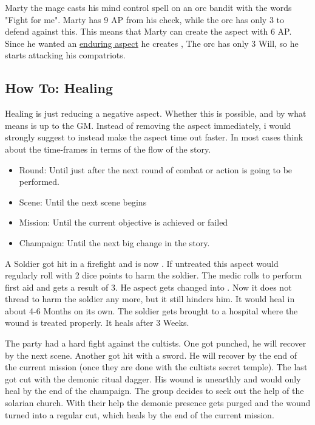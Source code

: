 \documentclass[11pt]{article}
\begin{document}
{\begin{pwexample}
Marty the mage casts his mind control spell on an orc bandit with the words "Fight for me". Marty has 9 AP from his check, while the orc has only 3 to defend against this. This means that Marty can create the aspect with 6 AP. Since he wanted an \hyperref[sec:orgd783730]{enduring aspect} he creates , The orc has only 3 Will, so he starts attacking his compatriots. 
\end{pwexample}
\subsection{How To: Healing}
\label{sec:org104db12}
Healing is just reducing a negative aspect. Whether this is possible, and by what means is up to the GM. Instead of removing the aspect immediately, i would strongly suggest to instead make the aspect time out faster. In most cases think about the time-frames in terms of the flow of the story.
\begin{itemize}
\item Round: Until just after the next round of combat or action is going to be performed.
\item Scene: Until the next scene begins
\item Mission: Until the current objective is achieved or failed
\item Champaign: Until the next big change in the story.
\end{itemize}

\begin{pwexample}
A Soldier got hit in a firefight and is now . If untreated this aspect would regularly roll with 2 dice points to harm the soldier. The medic rolls to perform first aid and gets a result of 3. He aspect gets changed into . Now it does not thread to harm the soldier any more, but it still hinders him. It would heal in about 4-6 Months on its own. The soldier gets brought to a hospital where the wound is treated properly. It heals after 3 Weeks. 
\end{pwexample}

\begin{pwexample}
The party had a hard fight against the cultists. One got punched, he will recover by the next scene. Another got hit with a sword. He will recover by the end of the current mission (once they are done with the cultists secret temple). The last got cut with the demonic ritual dagger. His wound is unearthly and would only heal by the end of the champaign. The group decides to seek out the help of the solarian church. With their help the demonic presence gets purged  and the wound turned into a regular cut, which heals by the end of the current mission.
\end{pwexample}
}
\end{document}
